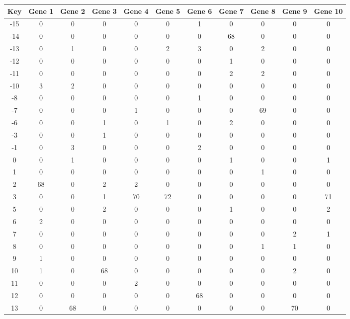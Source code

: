 \begin{tabular}{|c|c|c|c|c|c|c|c|c|c|c|}
\hline
Key & Gene 1 & Gene 2 & Gene 3 & Gene 4 & Gene 5 & Gene 6 & Gene 7 & Gene 8 & Gene 9 & Gene 10 \\
\hline
-15 & 0 & 0 & 0 & 0 & 0 & 1 & 0 & 0 & 0 & 0 \\
-14 & 0 & 0 & 0 & 0 & 0 & 0 & 68 & 0 & 0 & 0 \\
-13 & 0 & 1 & 0 & 0 & 2 & 3 & 0 & 2 & 0 & 0 \\
-12 & 0 & 0 & 0 & 0 & 0 & 0 & 1 & 0 & 0 & 0 \\
-11 & 0 & 0 & 0 & 0 & 0 & 0 & 2 & 2 & 0 & 0 \\
-10 & 3 & 2 & 0 & 0 & 0 & 0 & 0 & 0 & 0 & 0 \\
-8 & 0 & 0 & 0 & 0 & 0 & 1 & 0 & 0 & 0 & 0 \\
-7 & 0 & 0 & 0 & 1 & 0 & 0 & 0 & 69 & 0 & 0 \\
-6 & 0 & 0 & 1 & 0 & 1 & 0 & 2 & 0 & 0 & 0 \\
-3 & 0 & 0 & 1 & 0 & 0 & 0 & 0 & 0 & 0 & 0 \\
-1 & 0 & 3 & 0 & 0 & 0 & 2 & 0 & 0 & 0 & 0 \\
0 & 0 & 1 & 0 & 0 & 0 & 0 & 1 & 0 & 0 & 1 \\
1 & 0 & 0 & 0 & 0 & 0 & 0 & 0 & 1 & 0 & 0 \\
2 & 68 & 0 & 2 & 2 & 0 & 0 & 0 & 0 & 0 & 0 \\
3 & 0 & 0 & 1 & 70 & 72 & 0 & 0 & 0 & 0 & 71 \\
5 & 0 & 0 & 2 & 0 & 0 & 0 & 1 & 0 & 0 & 2 \\
6 & 2 & 0 & 0 & 0 & 0 & 0 & 0 & 0 & 0 & 0 \\
7 & 0 & 0 & 0 & 0 & 0 & 0 & 0 & 0 & 2 & 1 \\
8 & 0 & 0 & 0 & 0 & 0 & 0 & 0 & 1 & 1 & 0 \\
9 & 1 & 0 & 0 & 0 & 0 & 0 & 0 & 0 & 0 & 0 \\
10 & 1 & 0 & 68 & 0 & 0 & 0 & 0 & 0 & 2 & 0 \\
11 & 0 & 0 & 0 & 2 & 0 & 0 & 0 & 0 & 0 & 0 \\
12 & 0 & 0 & 0 & 0 & 0 & 68 & 0 & 0 & 0 & 0 \\
13 & 0 & 68 & 0 & 0 & 0 & 0 & 0 & 0 & 70 & 0 \\
\hline
\end{tabular}